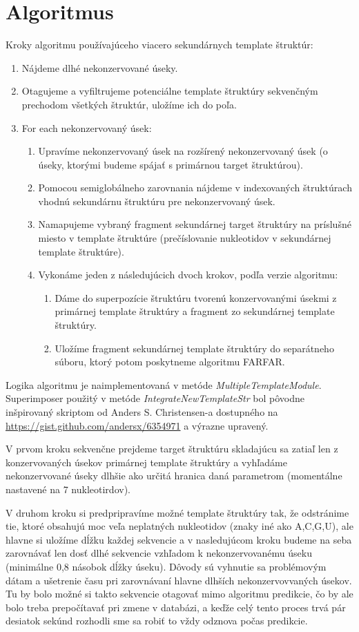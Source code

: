 \section{Algoritmus}
\indent Kroky algoritmu používajúceho viacero sekundárnych template štruktúr:
\begin{enumerate}
\item Nájdeme dlhé nekonzervované úseky.
\item Otagujeme a vyfiltrujeme potenciálne template štruktúry sekvenčným prechodom všetkých štruktúr, uložíme  ich do poľa.
\item For each nekonzervovaný úsek:
\begin{enumerate}
\item Upravíme nekonzervovaný úsek na rozšírený nekonzervovaný úsek (o úseky, ktorými budeme spájať s primárnou target štruktúrou).
\item Pomocou semiglobálneho zarovnania nájdeme v indexovaných štruktúrach vhodnú sekundárnu štruktúru pre nekonzervovaný úsek.
\item Namapujeme vybraný fragment sekundárnej target štruktúry na príslušné miesto v template štruktúre (prečíslovanie nukleotidov v sekundárnej template štruktúre).
\item Vykonáme jeden z následujúcich dvoch krokov, podľa verzie algoritmu:
\begin{enumerate}
\item Dáme do superpozície štruktúru tvorenú konzervovanými úsekmi z primárnej template štruktúry a fragment zo sekundárnej template štruktúry.
\item Uložíme fragment sekundárnej template štruktúry do separátneho súboru, ktorý potom poskytneme algoritmu FARFAR.
\end{enumerate}
\end{enumerate}
\end{enumerate}


\indent Logika algoritmu je naimplementovaná v metóde \textit{MultipleTemplateModule}. Superimposer použitý v metóde \textit{IntegrateNewTemplateStr} bol pôvodne inšpirovaný skriptom od Anders S. Christensen-a dostupného na \url{https://gist.github.com/andersx/6354971} a výrazne upravený.  


\indent V prvom kroku sekvenčne prejdeme target štruktúru skladajúcu sa zatiaľ len z konzervovaných úsekov primárnej template štruktúry a vyhľadáme nekonzervované úseky dlhšie ako určitá hranica daná parametrom (momentálne nastavené na 7 nukleotirdov).


\indent V druhom kroku si predpripravíme možné template štruktúry tak, že odstránime tie, ktoré obsahujú moc veľa neplatných nukleotidov (znaky iné ako A,C,G,U), ale hlavne si uložíme dĺžku každej sekvencie a v nasledujúcom kroku budeme na seba zarovnávať len dosť dlhé sekvencie vzhľadom k nekonzervovanému úseku (minimálne 0,8 násobok dĺžky úseku). Dôvody sú vyhnutie sa problémovým dátam a ušetrenie času pri zarovnávaní hlavne dlhších nekonzervovvaných úsekov. Tu by bolo možné si takto sekvencie otagovať mimo algoritmu predikcie, čo by ale bolo treba prepočítavať pri zmene v databázi, a keďže celý tento proces trvá pár desiatok sekúnd rozhodli sme sa robiť to vždy odznova počas predikcie.


